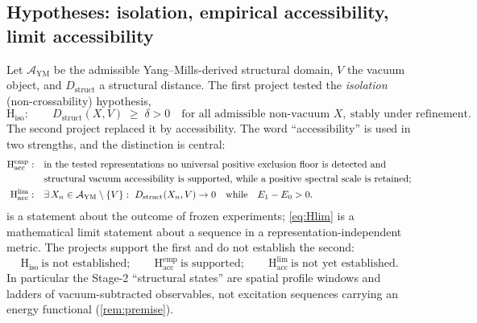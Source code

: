 \documentclass[11pt,a4paper]{article}
\theoremstyle{definition}
\theoremstyle{remark}
\newcommand{\Dstruct}{D_{\mathrm{struct}}}
\newcommand{\AYM}{\mathcal{A}_{\mathrm{YM}}}
\newcommand{\Hacc}{\mathrm{H}_{\mathrm{acc}}}
\newcommand{\Hiso}{\mathrm{H}_{\mathrm{iso}}}
\begin{document}
\subsection{Hypotheses: isolation, empirical accessibility, limit accessibility}
Let $\AYM$ be the admissible Yang--Mills-derived structural domain, $V$ the vacuum object, and $\Dstruct$ a structural distance. The first project tested the \emph{isolation} (non-crossability) hypothesis,
\begin{equation}\label{eq:Hiso}
\Hiso:\qquad \Dstruct(X,V)\;\ge\;\delta>0\quad\text{for all admissible non-vacuum }X,\ \text{stably under refinement.}
\end{equation}
The second project replaced it by accessibility. The word ``accessibility'' is used in two strengths, and the distinction is central:
\begin{align}
\Hacc^{\mathrm{emp}}:&\quad\text{in the tested representations no universal positive exclusion floor is detected and}\notag\\
&\quad\text{structural vacuum accessibility is supported, while a positive spectral scale is retained;}\label{eq:Hemp}\\
\Hacc^{\mathrm{lim}}:&\quad\exists\,X_n\in\AYM\setminus\{V\}:\ \Dstruct(X_n,V)\to0\quad\text{while}\quad E_1-E_0>0.\label{eq:Hlim}
\end{align}
 is a statement about the outcome of frozen experiments; \cref{eq:Hlim} is a mathematical limit statement about a sequence in a representation-independent metric. The projects support the first and do not establish the second:
\begin{equation}\label{eq:status}
\boxed{\ \Hiso\ \text{is not established};\qquad \Hacc^{\mathrm{emp}}\ \text{is supported};\qquad \Hacc^{\mathrm{lim}}\ \text{is not yet established.}\ }
\end{equation}
In particular the Stage-2 ``structural states'' are spatial profile windows and ladders of vacuum-subtracted observables, not excitation sequences carrying an energy functional (\cref{rem:premise}).
\end{document}
